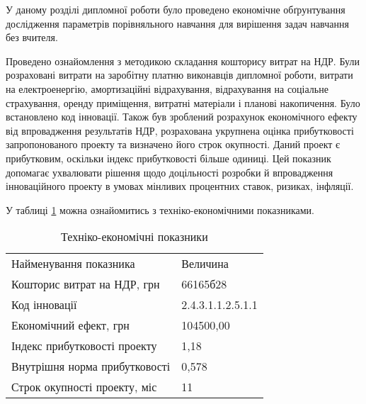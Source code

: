 У даному розділі дипломної роботи було проведено економічне обґрунтування дослідження параметрів порівняльного навчання для вирішення задач навчання без вчителя.

Проведено ознайомлення з методикою складання кошторису витрат на НДР. Були розраховані витрати на заробітну платню виконавців дипломної роботи, витрати на електроенергію, амортизаційні відрахування, відрахування на соціальне страхування, оренду приміщення, витратні матеріали і планові накопичення. Було встановлено код інновації. Також був зроблений розрахунок економічного ефекту від впровадження результатів НДР, розрахована укрупнена оцінка прибутковості запропонованого проекту та визначено його строк окупності. Даний проект є прибутковим, оскільки індекс прибутковості більше одиниці. Цей показник допомагає ухвалювати рішення щодо доцільності розробки й впровадження інноваційного проекту в умовах мінливих процентних ставок, ризиках, інфляції.

У таблиці \ref{tab:summary} можна ознайомитись з техніко-економічними показниками.

\begin{table}[h!]
	\captionstyle{ \raggedright}
	\caption{Техніко-економічні показники}\label{tab:summary}
	\begin{tabular}{| p{} | p{} |} 
		\hline
		Найменування показника & Величина \\
		\hlinewd{2pt}
		Кошторис витрат на НДР, грн & 66165б28 \\
		\hline
		Код інновації & 2.4.3.1.1.2.5.1.1 \\
		\hline
		Економічний ефект, грн & 104500,00 \\
		\hline
		Індекс прибутковості проекту & 1,18 \\
		\hline
		Внутрішня норма прибутковості & 0,578 \\
		\hline
		Строк окупності проекту, міс & 11 \\
		\hline
	\end{tabular}
\end{table}

